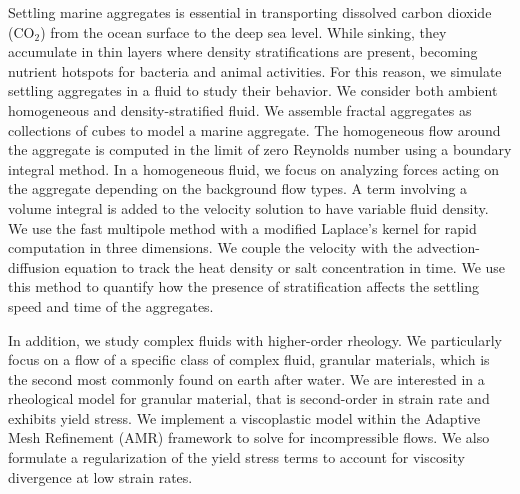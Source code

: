 
\par
Settling marine aggregates is essential in transporting dissolved carbon dioxide (CO$_2$) from the ocean surface to the deep sea level. While sinking, they accumulate in thin layers where density stratifications are present, becoming nutrient hotspots for bacteria and animal activities. For this reason, we simulate settling aggregates in a fluid to study their behavior. We consider both ambient homogeneous and density-stratified fluid. We assemble fractal aggregates as collections of cubes to model a marine aggregate. The homogeneous flow around the aggregate is computed in the limit of zero Reynolds number using a boundary integral method. 
In a homogeneous fluid, we focus on analyzing forces acting on the aggregate depending on the background flow types. 
A term involving a volume integral is added to the velocity solution to have variable fluid density. We use the fast multipole method with a modified Laplace's kernel for rapid computation in three dimensions. We couple the velocity with the advection-diffusion equation to track the heat density or salt concentration in time. We use this method to quantify how the presence of stratification affects the settling speed and time of the aggregates.
\par
In addition, we study complex fluids with higher-order rheology. 
We particularly focus on a flow of 
a specific class of complex fluid, granular materials, which is the second most commonly found on earth after water. 
We are interested in a rheological model for granular material, that is second-order in strain rate and exhibits yield stress.
We implement a viscoplastic model within the Adaptive Mesh Refinement (AMR) framework to solve for incompressible flows.
We also formulate a regularization of the yield stress terms to account for viscosity divergence at low strain rates.